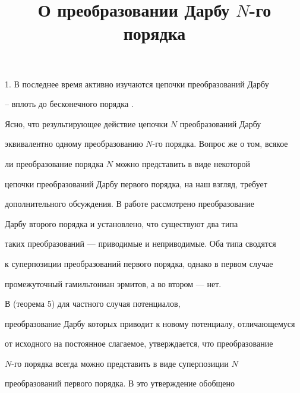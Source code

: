 \title{О преобразовании Дарбу $N$-го порядка}





\date{}




\pagestyle{plain} %







\maketitle


\label{begin}





1. В последнее время активно изучаются цепочки преобразований Дарбу


\cite{L}--\cite{D} вплоть до бесконечного порядка \cite{xxx}.


Ясно, что результирующее действие  цепочки $N$ преобразований Дарбу


эквивалентно одному преобразованию $N$-го порядка. Вопрос же о том, всякое


ли преобразование порядка $N$ можно представить в виде некоторой


цепочки преобразований Дарбу первого порядка, на наш взгляд, требует


дополнительного обсуждения. В работе \cite{xxx} рассмотрено преобразование


Дарбу второго порядка и установлено, что существуют два типа


таких преобразований --- приводимые и неприводимые. Оба типа сводятся


к суперпозиции преобразований первого порядка, однако в первом случае


промежуточный гамильтониан эрмитов, а во втором --- нет.


В \cite{L} (теорема 5) для частного случая потенциалов,


преобразование Дарбу которых приводит к новому потенциалу, отличающемуся


от исходного на постоянное слагаемое, утверждается, что преобразование


$N$-го порядка всегда можно представить в виде суперпозиции $N$


преобразований первого порядка. В \cite{xii} это утверждение обобщено


